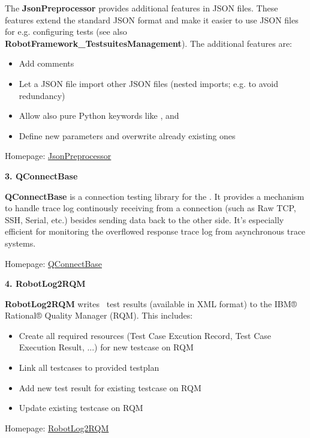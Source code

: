 The \textbf{JsonPreprocessor} provides additional features in JSON files. These features extend the standard JSON format and make it easier
to use JSON files for e.g. configuring tests (see also \textbf{RobotFramework\_TestsuitesManagement}). The additional features are:
\begin{itemize}
   \item Add comments
   \item Let a JSON file import other JSON files (nested imports; e.g. to avoid redundancy)
   \item Allow also pure Python keywords like ,  and 
   \item Define new parameters and overwrite already existing ones
\end{itemize}

Homepage: \href{https://github.com/test-fullautomation/python-jsonpreprocessor}{JsonPreprocessor}

\vspace{2ex}

\textbf{3. QConnectBase}

\textbf{QConnectBase} is a connection testing library for the \rfwcore. It provides a mechanism to handle trace log continously receiving from a connection
(such as Raw TCP, SSH, Serial, etc.) besides sending data back to the other side. It's especially efficient for monitoring the overflowed response trace log
from asynchronous trace systems.

Homepage: \href{https://github.com/test-fullautomation/robotframework-qconnect-base}{QConnectBase}

\vspace{2ex}

\textbf{4. RobotLog2RQM}

\textbf{RobotLog2RQM} writes \rfwcore\ test results (available in XML format) to the IBM® Rational® Quality Manager (RQM).
This includes:
\begin{itemize}
   \item Create all required resources (Test Case Excution Record, Test Case Execution Result, ...) for new testcase on RQM
   \item Link all testcases to provided testplan
   \item Add new test result for existing testcase on RQM
   \item Update existing testcase on RQM
\end{itemize}

Homepage: \href{https://github.com/test-fullautomation/robotframework-robotlog2rqm}{RobotLog2RQM}

